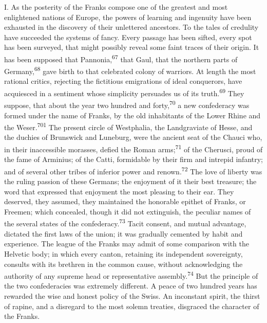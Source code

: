 


I. As the posterity of the Franks compose one of the greatest and
most enlightened nations of Europe, the powers of learning and
ingenuity have been exhausted in the discovery of their
unlettered ancestors. To the tales of credulity have succeeded
the systems of fancy. Every passage has been sifted, every spot
has been surveyed, that might possibly reveal some faint traces
of their origin. It has been supposed that Pannonia,\textsuperscript{67} that
Gaul, that the northern parts of Germany,\textsuperscript{68} gave birth to that
celebrated colony of warriors. At length the most rational
critics, rejecting the fictitious emigrations of ideal
conquerors, have acquiesced in a sentiment whose simplicity
persuades us of its truth.\textsuperscript{69} They suppose, that about the year
two hundred and forty,\textsuperscript{70} a new confederacy was formed under the
name of Franks, by the old inhabitants of the Lower Rhine and the
Weser.\textsuperscript{701} The present circle of Westphalia, the Landgraviate of
Hesse, and the duchies of Brunswick and Luneburg, were the
ancient seat of the Chauci who, in their inaccessible morasses,
defied the Roman arms;\textsuperscript{71} of the Cherusci, proud of the fame of
Arminius; of the Catti, formidable by their firm and intrepid
infantry; and of several other tribes of inferior power and
renown.\textsuperscript{72} The love of liberty was the ruling passion of these
Germans; the enjoyment of it their best treasure; the word that
expressed that enjoyment the most pleasing to their ear. They
deserved, they assumed, they maintained the honorable epithet of
Franks, or Freemen; which concealed, though it did not
extinguish, the peculiar names of the several states of the
confederacy.\textsuperscript{73} Tacit consent, and mutual advantage, dictated the
first laws of the union; it was gradually cemented by habit and
experience. The league of the Franks may admit of some comparison
with the Helvetic body; in which every canton, retaining its
independent sovereignty, consults with its brethren in the common
cause, without acknowledging the authority of any supreme head or
representative assembly.\textsuperscript{74} But the principle of the two
confederacies was extremely different. A peace of two hundred
years has rewarded the wise and honest policy of the Swiss. An
inconstant spirit, the thirst of rapine, and a disregard to the
most solemn treaties, disgraced the character of the Franks.

